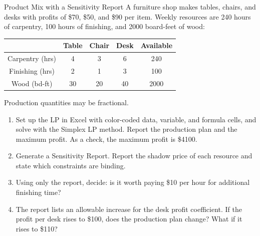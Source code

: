 \begin{ex}{Product Mix with a Sensitivity Report}{}
\label{ex:excel-furniture-sensitivity}
 A furniture shop makes tables, chairs, and desks with profits of \$70, \$50, and \$90 per item.  Weekly resources are 240 hours of carpentry, 100 hours of finishing, and 2000 board-feet of wood:

\begin{center}
\begin{tabular}{c|c|c|c|c}
 & \textbf{Table} & \textbf{Chair} & \textbf{Desk} & \textbf{Available} \\
\hline
Carpentry (hrs) & 4 & 3 & 6 & 240 \\
Finishing (hrs) & 2 & 1 & 3 & 100 \\
Wood (bd-ft) & 30 & 20 & 40 & 2000 \\
\end{tabular}
\end{center}

Production quantities may be fractional.
\begin{enumerate}
\item Set up the LP in Excel with color-coded data, variable, and formula cells, and solve with the Simplex LP method.  Report the production plan and the maximum profit.  As a check, the maximum profit is \$4100.
\item Generate a Sensitivity Report.  Report the shadow price of each resource and state which constraints are binding.
\item Using only the report, decide: is it worth paying \$10 per hour for additional finishing time?
\item The report lists an allowable increase for the desk profit coefficient.  If the profit per desk rises to \$100, does the production plan change?  What if it rises to \$110?
\end{enumerate}
\exrefs{\S\ref{sec:excel-solver}}
\end{ex}

